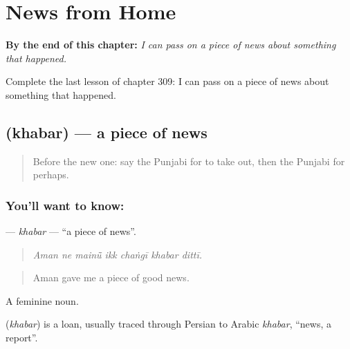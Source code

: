 
\chapter{News from Home}
\label{ch:pa-a2-news-from-home}

\begin{chapteropening}
\textbf{By the end of this chapter:} \emph{I can pass on a piece of news about something that happened.}

Complete the last lesson of chapter 309: I can pass on a piece of news about something that happened.
\end{chapteropening}

\section[\texorpdfstring{\pa{ਖ਼ਬਰ} (khabar)}{ਖ਼ਬਰ (khabar)}]{ (khabar) — a piece of news}

\label{lesson:PA-C309-khabar}



\begin{quote}
Before the new one: say the Punjabi for to take out, then the Punjabi for perhaps.
\end{quote}

\subsection*{You'll want to know: }
\textbf{} — \emph{khabar} — \textquotedblleft{}a piece of news\textquotedblright{}.

\begin{quote}
      
\end{quote}

\begin{quote}
\emph{Aman ne mainū̃ ikk chaṅgī khabar dittī.}
\end{quote}

\begin{quote}
Aman gave me a piece of good news.
\end{quote}

A feminine noun.

\begin{cousinweb}
\textbf{} (\emph{khabar}) is a loan, usually traced through Persian to Arabic \emph{khabar}, \textquotedblleft{}news, a report\textquotedblright{}.
\end{cousinweb}


